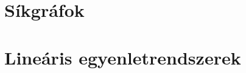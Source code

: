 \documentclass[12pt]{article}
\begin{document}
		

	\section{Síkgráfok}

		

	\section{Lineáris egyenletrendszerek}

		






\end{document}
